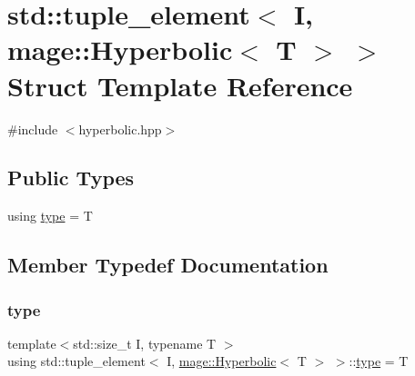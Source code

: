 \hypertarget{structstd_1_1tuple__element_3_01_i_00_01mage_1_1_hyperbolic_3_01_t_01_4_01_4}{}\section{std\+:\+:tuple\+\_\+element$<$ I, mage\+:\+:Hyperbolic$<$ T $>$ $>$ Struct Template Reference}
\label{structstd_1_1tuple__element_3_01_i_00_01mage_1_1_hyperbolic_3_01_t_01_4_01_4}


{\ttfamily \#include $<$hyperbolic.\+hpp$>$}

\subsection*{Public Types}
\begin{DoxyCompactItemize}
\item 
using \mbox{\hyperlink{structstd_1_1tuple__element_3_01_i_00_01mage_1_1_hyperbolic_3_01_t_01_4_01_4_a6c24687c3d82db16d93cb5e916b0ccb9}{type}} = T
\end{DoxyCompactItemize}


\subsection{Member Typedef Documentation}
\mbox{\label{structstd_1_1tuple__element_3_01_i_00_01mage_1_1_hyperbolic_3_01_t_01_4_01_4_a6c24687c3d82db16d93cb5e916b0ccb9}} 
\subsubsection{\texorpdfstring{type}{type}}
{\footnotesize\ttfamily template$<$std\+::size\+\_\+t I, typename T $>$ \\
using std\+::tuple\+\_\+element$<$ I, \mbox{\hyperlink{structmage_1_1_hyperbolic}{mage\+::\+Hyperbolic}}$<$ T $>$ $>$\+::\mbox{\hyperlink{structstd_1_1tuple__element_3_01_i_00_01mage_1_1_hyperbolic_3_01_t_01_4_01_4_a6c24687c3d82db16d93cb5e916b0ccb9}{type}} =  T}

